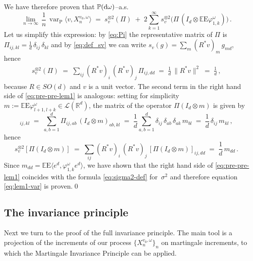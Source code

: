 \documentclass[a4paper,reqno,11pt]{amsart}
\numberwithin{equation}{section}
\newcommand{\bbE}{{\ensuremath{\mathbb E}} }
\newcommand{\bbP}{{\ensuremath{\mathbb P}} }
\newcommand{\cL}{{\ensuremath{\mathcal L}} }
\newcommand{\gd}{\delta}
\newcommand{\gs}{\sigma}
\newcommand{\go}{\omega}
\newcommand{\dd}{\text{\rm d}}             %
\newcommand{\R}{\mathbb{R}}
\DeclareMathOperator{\var}{var}
\def\bP{\ensuremath{\bs{\mathrm{P}}}}
\def\bE{\ensuremath{\bs{\mathrm{E}}}}
\def\bs{\boldsymbol}
\begin{document}
We have therefore proven that $\bbP(\dd \go)$--a.s.
\begin{equation}
\label{eq:pre-pre-lem1}
\lim_{n \to \infty} \, \frac 1n \,
\var_{\bP} \langle v, X_n^{v_0, \go}\rangle \;=\;
s_v^{\otimes 2} (\Pi) \;+\;  2 \sum_{k=1}^\infty
s_v^{\otimes 2} \big( \Pi \, (I_d \otimes \bbE  \bE \varphi^\omega_{1,k}) \big) \,.
\end{equation}
Let us simplify this expression: by
\eqref{eq:Pi} the representative matrix of $\Pi$
is $\Pi_{ij, kl} = \frac 1d \, \gd_{ij} \, \gd_{kl}$ and
by \eqref{eq:def_sv} we can write $s_v(g) = \sum_m (R^*v)_m \, g_{md}$, hence
\begin{align} \label{eq:asd}
s_v^{\otimes 2} (\Pi)  \;=\;
\sum_{ij} (R^*v)_{i} \, (R^*v)_{j} \, \Pi_{ij, dd} \;=\;
\frac 1d \, \| R^*v\|^2 \;=\; \frac 1d\,,
\end{align}
because $R \in SO(d)$ and $v$ is a unit vector.
The second term in the right hand side of \eqref{eq:pre-pre-lem1} is
analogous: setting for simplicity $m := \bbE  \bE \varphi^\omega_{l+1,l+k}
\in \cL(\R^d)$, the matrix of the operator $\Pi(I_d \otimes m)$ is given by
\begin{equation}
	[\Pi(I_d \otimes m)]_{ij, kl} \;=\; \sum_{a,b = 1}^d
	\Pi_{ij, ab} \, (I_d \otimes m)_{ab, kl} \;=\;
	\frac 1d \sum_{a,b = 1}^d \gd_{ij} \, \gd_{ab} \, \gd_{ak}
	\, m_{bl} \;=\; \frac 1d \, \gd_{ij} \, m_{kl} \,,
\end{equation}
hence
\begin{equation} \label{eq:asd2}
s_v ^{\otimes 2}[ \Pi (I_d \otimes m) ]
\;=\; \sum_{ij} (R^*v)_{i} \, (R^*v)_{j} \, [\Pi(I_d \otimes m)]_{ij, dd}
\;=\; \frac 1d \, m_{dd}\,.
\end{equation}
Since $m_{dd} = \bbE  \bE \langle e^d, \varphi^\omega_{1,k} e^d \rangle$,
we have shown that the right hand side of \eqref{eq:pre-pre-lem1} coincides with
the formula \eqref{eq:sigma2-def} for~$\gs^2$ and therefore
equation \eqref{eq:lem1-var} is proven.\qed

\smallskip


\smallskip

\subsection{The invariance principle}
\label{sec:inv_pr}

Next we turn to the proof of the full invariance principle.
The main tool is a projection of the increments
of our process $\{X^{v_0, \go}_n\}_n$
on martingale increments, to which the Martingale Invariance Principle can be applied.
\end{document}
